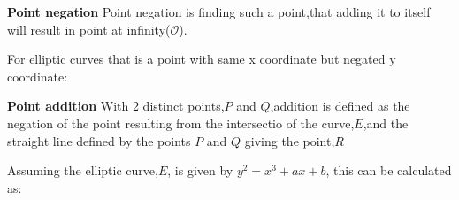 \documentclass{article}
\begin{document}
\hspace{4cm}
\begin{centre}
\newline
\end{centre}

\hspace{4cm}
\begin{centre}
\end{centre}

\textbf{Point negation}
\newline
Point negation is finding such a point,that adding it to itself will result in point at infinity(\({\mathcal{O}}\)).

\hspace{3.9cm}
\begin{centre}
\end{centre}

For elliptic curves that is a point with same x coordinate but negated y coordinate:

\begin{centre}
\end{centre}
\begin{centre}
\end{centre}
\begin{centre}
\end{centre}

\textbf{Point addition}
\newline
With 2 distinct points,$P$ and $Q$,addition is defined as the negation of the point resulting from the intersectio of the curve,$E$,and the straight line defined by the points $P$ and $Q$ giving the point,$R$

\hspace{4.3cm}
\begin{centre}
\end{centre}

Assuming the elliptic curve,$E$, is given by \(y^2=x^3+ax+b\), this can be calculated as:
\hspace{3cm}
\begin{center}
\end{center}
\hspace{2.5cm}
\begin{centre}
\end{centre}
\begin{centre}
\end{centre}
\end{document}
